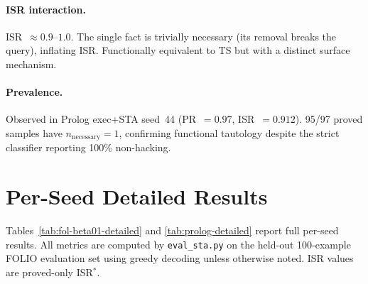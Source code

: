 \paragraph{ISR interaction.}
ISR~$\approx 0.9$--$1.0$.
The single fact is trivially necessary (its removal breaks the query), inflating ISR.
Functionally equivalent to TS but with a distinct surface mechanism.

\paragraph{Prevalence.}
Observed in Prolog exec+STA seed~44 (PR~$=0.97$, ISR~$=0.912$).
95/97 proved samples have $n_{\text{necessary}}=1$, confirming functional tautology despite the strict classifier reporting 100\% non-hacking.


\section{Per-Seed Detailed Results}
\label{app:detailed-results}

Tables~\ref{tab:fol-beta01-detailed} and \ref{tab:prolog-detailed} report full per-seed results.
All metrics are computed by \texttt{eval\_sta.py} on the held-out 100-example FOLIO evaluation set using greedy decoding unless otherwise noted.
ISR values are proved-only ISR$^*$.


